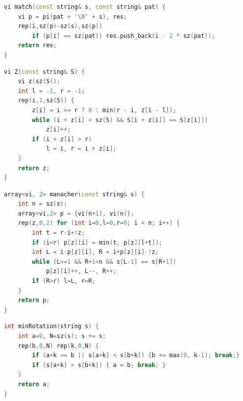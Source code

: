 \begin{multicols}{\Columns}
\begin{lstlisting}[language=C++]
vi match(const string& s, const string& pat) {
	vi p = pi(pat + '\0' + s), res;
	rep(i,sz(p)-sz(s),sz(p))
		if (p[i] == sz(pat)) res.push_back(i - 2 * sz(pat));
	return res;
}
\end{lstlisting}

\begin{lstlisting}[language=C++]
vi Z(const string& S) {
	vi z(sz(S));
	int l = -1, r = -1;
	rep(i,1,sz(S)) {
		z[i] = i >= r ? 0 : min(r - i, z[i - l]);
		while (i + z[i] < sz(S) && S[i + z[i]] == S[z[i]])
			z[i]++;
		if (i + z[i] > r)
			l = i, r = i + z[i];
	}
	return z;
}
\end{lstlisting}

\begin{lstlisting}[language=C++]
array<vi, 2> manacher(const string& s) {
	int n = sz(s);
	array<vi,2> p = {vi(n+1), vi(n)};
	rep(z,0,2) for (int i=0,l=0,r=0; i < n; i++) {
		int t = r-i+!z;
		if (i<r) p[z][i] = min(t, p[z][l+t]);
		int L = i-p[z][i], R = i+p[z][i]-!z;
		while (L>=1 && R+1<n && s[L-1] == s[R+1])
			p[z][i]++, L--, R++;
		if (R>r) l=L, r=R;
	}
	return p;
}
\end{lstlisting}

\begin{lstlisting}[language=C++]
int minRotation(string s) {
	int a=0, N=sz(s); s += s;
	rep(b,0,N) rep(k,0,N) {
		if (a+k == b || s[a+k] < s[b+k]) {b += max(0, k-1); break;}
		if (s[a+k] > s[b+k]) { a = b; break; }
	}
	return a;
}
\end{lstlisting}


\end{multicols}
